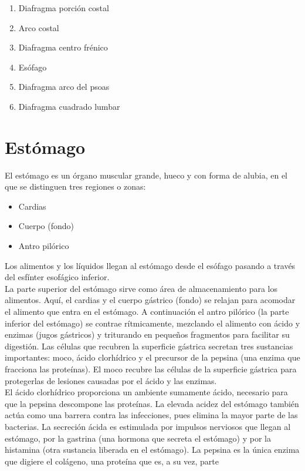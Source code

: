 \begin{enumerate}
    \item Diafragma porción costal
    \item Arco costal
    \item Diafragma centro frénico
    \item Esófago
    \item Diafragma arco del psoas
    \item Diafragma cuadrado lumbar    
\end{enumerate}

\section{Estómago}
El estómago es un órgano muscular grande, hueco y con forma de alubia, en el que se distinguen tres regiones o zonas:\\
\begin{itemize}
    \item Cardias
    \item Cuerpo (fondo)
    \item Antro pilórico    
\end{itemize}
Los alimentos y los líquidos llegan al estómago desde el esófago pasando a través del esfínter esofágico inferior.\\
La parte superior del estómago sirve como área de almacenamiento para los alimentos. Aquí, el cardias y el cuerpo gástrico (fondo) se relajan para acomodar el alimento 
que entra en el estómago. A continuación el antro pilórico (la parte inferior del estómago) se contrae rítmicamente, mezclando el alimento con ácido y enzimas (jugos gástricos) 
y triturando en pequeños fragmentos para facilitar su digestión. Las células que recubren la superficie gástrica secretan tres sustancias importantes: moco, ácido clorhídrico 
y el precursor de la pepsina (una enzima que fracciona las proteínas). El moco recubre las células de la superficie gástrica para protegerlas de lesiones causadas por el ácido 
y las enzimas.\\
El ácido clorhídrico proporciona un ambiente sumamente ácido, necesario para que la pepsina descompone las proteínas. La elevada acidez del estómago también actúa como una barrera 
contra las infecciones, pues elimina la mayor parte de las bacterias. La secreción ácida es estimulada por impulsos nerviosos que llegan al estómago, por la gastrina (una hormona 
que secreta el estómago) y por la histamina (otra sustancia liberada en el estómago). La pepsina es la única enzima que digiere el colágeno, una proteína que es, a su vez, parte 
